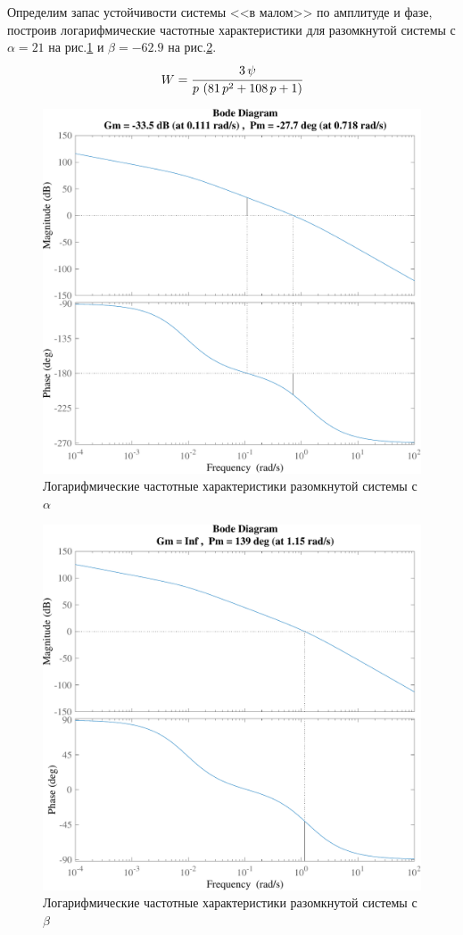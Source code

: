 Определим запас устойчивости системы <<в малом>> по амплитуде и фазе, построив логарифмические частотные характеристики для разомкнутой системы с $\alpha=21$ на рис.\ref{fig:Bode_diagram_alpha} и $\beta=-62.9$ на рис.\ref{fig:Bode_diagram_beta}. 
\begin{equation} \label{eq:}
W=\cfrac{3\,\psi}{p\,\left(81\,p^2+108\,p+1\right)}
\end{equation}
\begin{figure}[!h]\centering
\includegraphics[width=1.0\linewidth]{images/Bode_diagram_alpha}
\caption{ Логарифмические частотные характеристики разомкнутой системы с $\alpha$}\label{fig:Bode_diagram_alpha}
\end{figure}
\begin{figure}[!h]\centering
\includegraphics[width=1.0\linewidth]{images/Bode_diagram_beta}
\caption{ Логарифмические частотные характеристики разомкнутой системы с $\beta$}\label{fig:Bode_diagram_beta}
\end{figure}
